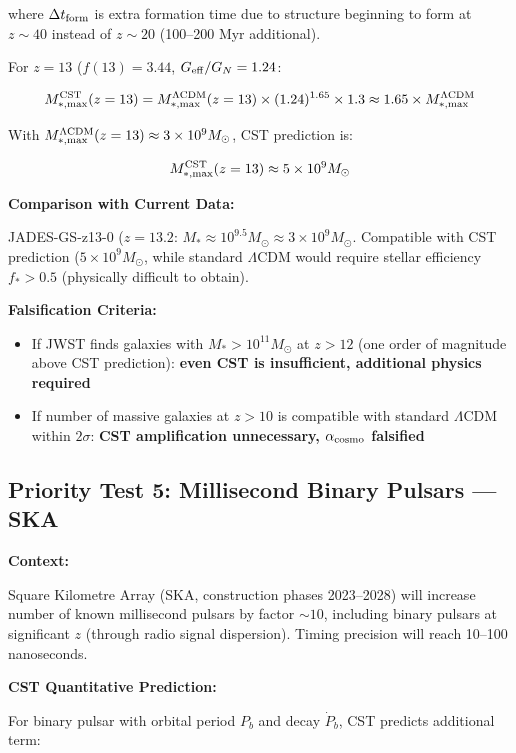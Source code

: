 \documentclass[10pt,a4paper]{article}
\providecommand{\tightlist}{\setlength{\itemsep}{0pt}\setlength{\parskip}{0pt}}
\begin{document}
where \(\Delta t_{\rm form}\) is extra formation time due to structure
beginning to form at \(z \sim 40\) instead of \(z \sim 20\) (100--200
Myr additional).

For \(z = 13\) (\(f(13) = 3.44\), \(G_{\rm eff}/G_N = 1.24\):

\[M_{*,\rm max}^{\rm CST}(z=13) = M_{*,\rm max}^{\Lambda{\rm CDM}}(z=13) \times (1.24)^{1.65} \times 1.3 \approx 1.65 \times M_{*,\rm max}^{\Lambda{\rm CDM}}\]

With
\(M_{*,\rm max}^{\Lambda{\rm CDM}}(z=13) \approx 3\times10^9 M_\odot\),
CST prediction is:

\[M_{*,\rm max}^{\rm CST}(z=13) \approx 5\times10^9 M_\odot\]

\textbf{Comparison with Current Data:}

JADES-GS-z13-0 (\(z=13.2\):
\(M_* \approx 10^{9.5} M_\odot \approx 3\times10^9 M_\odot\). Compatible
with CST prediction (\(5\times10^9 M_\odot\), while standard
\(\Lambda\)CDM would require stellar efficiency \(f_* > 0.5\)
(physically difficult to obtain).

\textbf{Falsification Criteria:}

\begin{itemize}
\tightlist
\item
  If JWST finds galaxies with \(M_* > 10^{11} M_\odot\) at \(z > 12\)
  (one order of magnitude above CST prediction): \textbf{even CST is
  insufficient, additional physics required}
\item
  If number of massive galaxies at \(z > 10\) is compatible with
  standard \(\Lambda\)CDM within \(2\sigma\): \textbf{CST amplification
  unnecessary, \(\alpha_{\rm cosmo}\) falsified}
\end{itemize}

\subsection{Priority Test 5: Millisecond Binary Pulsars ---
SKA}\label{priority-test-5-millisecond-binary-pulsars-ska}

\textbf{Context:}

Square Kilometre Array (SKA, construction phases 2023--2028) will
increase number of known millisecond pulsars by factor \(\sim 10\),
including binary pulsars at significant \(z\) (through radio signal
dispersion). Timing precision will reach 10--100 nanoseconds.

\textbf{CST Quantitative Prediction:}

For binary pulsar with orbital period \(P_b\) and decay \(\dot P_b\),
CST predicts additional term:
\end{document}
